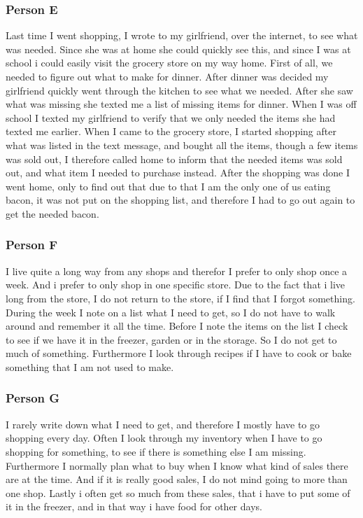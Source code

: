 \subsubsection{Person E}
Last time I went shopping, I wrote to my girlfriend, over the internet, to see what was needed. Since she was at home she could quickly see this, and since I was at school i could easily  visit the grocery store on my way home. First of all, we needed to figure out what to make for dinner. After dinner was decided my girlfriend quickly went through the kitchen to see what we needed. After she saw what was missing she texted me a list of missing items for dinner. When I was off school I texted my girlfriend to verify that we only needed the items she had texted me earlier. When I came to the grocery store, I started shopping after what was listed in the text message, and bought all the items, though a few items was sold out, I  therefore called home to inform that the needed items was sold out, and what item I needed to purchase instead. After the shopping was done I went home, only to find out that due to that I am the only one of us eating bacon, it was not put on the shopping list, and therefore I had to go out again to get the needed bacon.

\subsubsection{Person F}
I live quite a long way from any shops and therefor I prefer to only shop once a week. And i prefer to only shop in one specific store. Due to the fact that i live long from the store, I do not return to the store, if I find that I forgot something. During the week I note on a list what I need to get, so I do not have to walk around and remember it all the time. Before I note the items on the list I check to see if we have it in the freezer, garden or in the storage. So I do not get to much of something. Furthermore I look through recipes if I have to cook or bake something that I am not used to make.

\subsubsection{Person G}
I rarely write down what I need to get, and therefore I mostly have to go shopping every day. Often I look through my inventory when I have to go shopping for something, to see if there is something else I am missing. Furthermore I normally plan what to buy when I know what kind of sales there are at the time. And if it is really good sales, I do not mind going to more than one shop. Lastly i often get so much from these sales, that i have to put some of it in the freezer, and in that way i have food for other days.